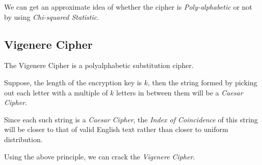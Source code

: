 \documentclass[10pt,twoside]{article}
\begin{document}
We can get an approximate idea of whether the cipher is \textit{Poly-alphabetic} or not by using \textit{Chi-squared Statistic}.

\subsection{Vigenere Cipher} \label{vc}
The Vigenere Cipher is a polyalphabetic substitution cipher. \newline

Suppose, the length of the encryption key is $k$, then the string formed by picking out each letter with a multiple of $k$ letters in between them will be a \textit{Caesar Cipher}. \newline

Since each such string is a \textit{Caesar Cipher}, the \textit{Index of Coincidence} of this string will be closer to that of valid English text rather than closer to uniform distribution. \newline

Using the above principle, we can crack the \textit{Vigenere Cipher}.
\end{document}
